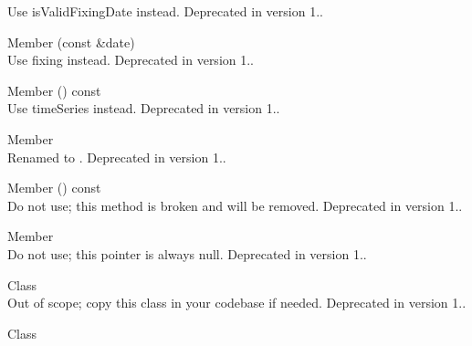 \begin{DoxyRefList}
\label{deprecated__deprecated000019}%
%
Use is\+Valid\+Fixing\+Date instead. Deprecated in version 1..  
\item[Member \doxylink{class_quant_lib_1_1_commodity_index_a0367ee921aecd579e2d970faa744997d}{Quant\+Lib\+::Commodity\+Index\+::price} (const \doxylink{class_quant_lib_1_1_date}{Date} \&date)]\hfill \\
\label{deprecated__deprecated000015}%
%
Use fixing instead. Deprecated in version 1..  
\item[Member \doxylink{class_quant_lib_1_1_commodity_index_a6422563d8e554a7cce0124e8e1b96530}{Quant\+Lib\+::Commodity\+Index\+::quotes} () const]\hfill \\
\label{deprecated__deprecated000020}%
%
Use time\+Series instead. Deprecated in version 1..  
\item[Member \doxylink{namespace_quant_lib_a24227fc2ee2a782bc70b4cfbfcd6816f}{Quant\+Lib\+::Compounding\+Rate\+Pricer} ]\hfill \\
\label{deprecated__deprecated000006}%
%
Renamed to . Deprecated in version 1..  
\item[Member \doxylink{class_quant_lib_1_1_c_p_i_bond_helper_a8f4edd923cc683be6f1ef0cc93abd7bc}{Quant\+Lib\+::CPIBond\+Helper\+::cpi\+Bond} () const]\hfill \\
\label{deprecated__deprecated000150}%
%
Do not use; this method is broken and will be removed. Deprecated in version 1..  
\item[Member \doxylink{class_quant_lib_1_1_c_p_i_bond_helper_ab96f99454b121e91baeafb3bdf05b406}{Quant\+Lib\+::CPIBond\+Helper\+::cpi\+Bond\+\_\+} ]\hfill \\
\label{deprecated__deprecated000151}%
%
Do not use; this pointer is always null. Deprecated in version 1..  
\item[Class \doxylink{class_quant_lib_1_1_credit_risk_plus}{Quant\+Lib\+::Credit\+Risk\+Plus} ]\hfill \\
\label{deprecated__deprecated000028}%
%
Out of scope; copy this class in your codebase if needed. Deprecated in version 1..  
\item[Class \doxylink{class_quant_lib_1_1_dated_o_i_s_rate_helper}{Quant\+Lib\+::Dated\+OISRate\+Helper} ]\hfill \\

\end{DoxyRefList}
